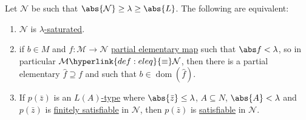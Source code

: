 \documentclass{article}
\DeclareMathOperator{\dom}{dom}
\begin{document}
\begin{nthm}\label{thm:6.5}
  Let $\mathcal{N}$ be such that $\abs{\mathcal{N}} \geq \lambda \geq \abs{L}$. The following are equivalent:
  \begin{enumerate}[label=(\roman*)]
    \item $\mathcal{N}$ is \hyperlink{def:sat}{$\lambda$-saturated}.
    \item if $b \in M$ and $f: \mathcal{M} \to \mathcal{N}$ \hyperlink{def:elmap}{partial elementary map} such that $\abs f < \lambda$, so in particular $\mathcal{M} \hyperlink{def:eleq}{\equiv} \mathcal{N}$, then there is a partial elementary $\hat{f} \supseteq f$ and such that $b \in \dom(\hat{f})$.
    \item If $p(\bar{z})$ is an \hyperlink{def:typeparam}{$L(A)$-type} where $\abs{\bar{z}} \leq \lambda$, $A \subseteq N$, $\abs{A} < \lambda$ and $p(\bar{z})$ is \hyperlink{def:type}{finitely satisfiable} in $\mathcal{N}$, then $p(\bar{z})$ is \hyperlink{def:type}{satisfiable} in $\mathcal{N}$.
  \end{enumerate}
\end{nthm}
\end{document}
